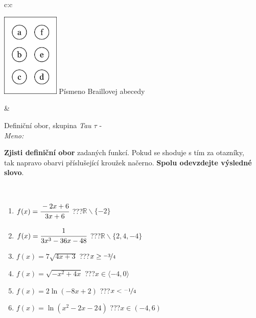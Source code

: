 \documentclass[10pt]{report}
\begin{document}
\begin{tabular}{c:c}
\begin{minipage}[c][104.5mm][t]{0.5\linewidth}
\begin{center}
\begin{minipage}{0.20\linewidth}
\begin{center}
\includegraphics[height=40mm]{../images/braille.png}
{\small Písmeno Braillovej abecedy}
\end{center}
\end{minipage}
\end{center}
\end{minipage}
&
\begin{minipage}[c][104.5mm][t]{0.5\linewidth}
\begin{center}
\vspace{7mm}
{\huge Definiční obor, skupina \textit{Tau $\tau$} -}\\[5mm]
\textit{Meno:}\phantom{xxxxxxxxxxxxxxxxxxxxxxxxxxxxxxxxxxxxxxxxxxxxxxxxxxxxxxxxxxxxxxxxx}\\[5mm]
\begin{minipage}{0.95\linewidth}
\textbf{Zjisti definiční obor} zadaných funkcí. Pokud se shoduje s tím za otazníky,\\tak napravo obarvi příslušející kroužek načerno. \textbf{Spolu odevzdejte výsledné slovo}.
\end{minipage}
\\[1mm]
\begin{minipage}{0.79\linewidth}
\begin{center}
\begin{varwidth}{\linewidth}
\begin{enumerate}
\normalsizerrr
\item $f(x)=\cfrac{-2x+6}{3x+6}$\quad \dotfill\; ???\;\dotfill \quad $\mathbb{R}\smallsetminus\{-2\}$
\item $f(x)=\cfrac{1}{3x^3-36x-48}$\quad \dotfill\; ???\;\dotfill \quad $\mathbb{R}\smallsetminus\{2,4,-4\}$
\item $f(x)=7\sqrt{4x+3}$\quad \dotfill\; ???\;\dotfill \quad $x\geq\nicefrac{-3}{4}$
\item $f(x)=\sqrt{-x^2+4x}$\quad \dotfill\; ???\;\dotfill \quad $x\in\langle-4 , 0\rangle$
\item $f(x)=2\ln{(-8x+2)}$\quad \dotfill\; ???\;\dotfill \quad $x<\nicefrac{-1}{4}$
\item $f(x)=\ln{(x^2-2x-24)}$\quad \dotfill\; ???\;\dotfill \quad $x\in(-4 , 6)$

\end{enumerate}
\end{varwidth}
\end{center}
\end{minipage}
\end{center}
\end{minipage}
\end{tabular}
\end{document}
